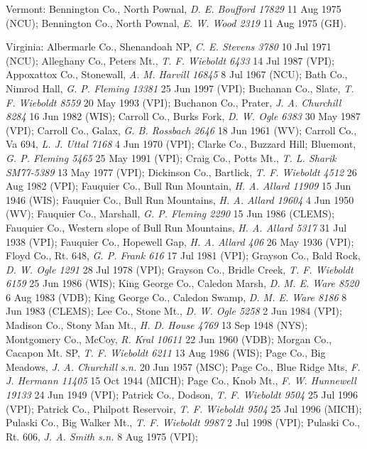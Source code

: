 \documentclass{article}
\begin{document}
Vermont:
Bennington Co., North Pownal, \textit{D. E. Boufford 17829} 11 Aug 1975 (NCU);
Bennington Co., North Pownal, \textit{E. W. Wood 2319} 11 Aug 1975 (GH).

Virginia:
Albermarle Co., Shenandoah NP, \textit{C. E. Stevens 3780} 10 Jul 1971 (NCU);
Alleghany Co., Peters Mt., \textit{T. F. Wieboldt 6433} 14 Jul 1987 (VPI);
Appoxattox Co., Stonewall, \textit{A. M. Harvill 16845} 8 Jul 1967 (NCU);
Bath Co., Nimrod Hall, \textit{G. P. Fleming 13381} 25 Jun 1997 (VPI);
Buchanan Co., Slate, \textit{T. F. Wieboldt 8559} 20 May 1993 (VPI);
Buchanon Co., Prater, \textit{J. A. Churchill 8284} 16 Jun 1982 (WIS);
Carroll Co., Burks Fork, \textit{D. W. Ogle 6383} 30 May 1987 (VPI);
Carroll Co., Galax, \textit{G. B. Rossbach 2646} 18 Jun 1961 (WV);
Carroll Co., Va 694, \textit{L. J. Uttal 7168} 4 Jun 1970 (VPI);
Clarke Co., Buzzard Hill; Bluemont, \textit{G. P. Fleming 5465} 25 May 1991 (VPI);
Craig Co., Potts Mt., \textit{T. L. Sharik SM77-5389} 13 May 1977 (VPI);
Dickinson Co., Bartlick, \textit{T. F. Wieboldt 4512} 26 Aug 1982 (VPI);
Fauquier Co., Bull Run Mountain, \textit{H. A. Allard 11909} 15 Jun 1946 (WIS);
Fauquier Co., Bull Run Mountains, \textit{H. A. Allard 19604} 4 Jun 1950 (WV);
Fauquier Co., Marshall, \textit{G. P. Fleming 2290} 15 Jun 1986 (CLEMS);
Fauquier Co., Western slope of Bull Run Mountains, \textit{H. A. Allard 5317} 31 Jul 1938 (VPI);
Fauquier Co., Hopewell Gap, \textit{H. A. Allard 406} 26 May 1936 (VPI);
Floyd Co., Rt. 648, \textit{G. P. Frank 616} 17 Jul 1981 (VPI);
Grayson Co., Bald Rock, \textit{D. W. Ogle 1291} 28 Jul 1978 (VPI);
Grayson Co., Bridle Creek, \textit{T. F. Wieboldt 6159} 25 Jun 1986 (WIS);
King George Co., Caledon Marsh, \textit{D. M. E. Ware 8520} 6 Aug 1983 (VDB);
King George Co., Caledon Swamp, \textit{D. M. E. Ware 8186} 8 Jun 1983 (CLEMS);
Lee Co., Stone Mt., \textit{D. W. Ogle 5258} 2 Jun 1984 (VPI);
Madison Co., Stony Man Mt., \textit{H. D. House 4769} 13 Sep 1948 (NYS);
Montgomery Co., McCoy, \textit{R. Kral 10611} 22 Jun 1960 (VDB);
Morgan Co., Cacapon Mt. SP, \textit{T. F. Wieboldt 6211} 13 Aug 1986 (WIS);
Page Co., Big Meadows, \textit{J. A. Churchill s.n.} 20 Jun 1957 (MSC);
Page Co., Blue Ridge Mts, \textit{F. J. Hermann 11405} 15 Oct 1944 (MICH);
Page Co., Knob Mt., \textit{F. W. Hunnewell 19133} 24 Jun 1949 (VPI);
Patrick Co., Dodson, \textit{T. F. Wieboldt 9504} 25 Jul 1996 (VPI);
Patrick Co., Philpott Reservoir, \textit{T. F. Wieboldt 9504} 25 Jul 1996 (MICH);
Pulaski Co., Big Walker Mt., \textit{T. F. Wieboldt 9987} 2 Jul 1998 (VPI);
Pulaski Co., Rt. 606, \textit{J. A. Smith s.n.} 8 Aug 1975 (VPI);
\end{document}

